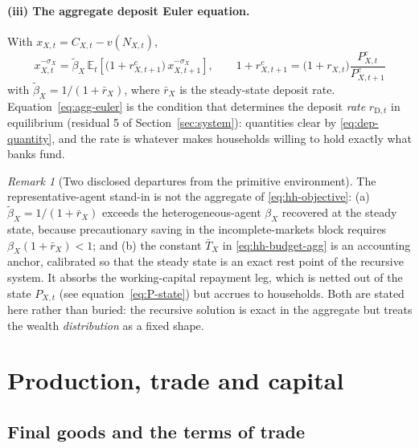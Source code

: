 \documentclass[11pt]{article}
\numberwithin{equation}{section}
\newcommand{\E}{\mathbb{E}}
\newcommand{\D}{\mathrm{D}}
\theoremstyle{definition}
\theoremstyle{plain}
\theoremstyle{remark}
\newtheorem{remark}{Remark}
\begin{document}
\paragraph{(iii) The aggregate deposit Euler equation.} With $x_{X,t}=C_{X,t}-v(N_{X,t})$,
\begin{equation}
\boxed{\;
x_{X,t}^{-\sigma_X}
=\tilde\beta_X\,
\E_t\!\left[\bigl(1+r^{c}_{X,t+1}\bigr)\,x_{X,t+1}^{-\sigma_X}\right],
\qquad
1+r^{c}_{X,t+1}=\bigl(1+r_{X,t}\bigr)\frac{P^{c}_{X,t}}{P^{c}_{X,t+1}} \;}
\label{eq:agg-euler}
\end{equation}
with $\tilde\beta_X=1/(1+\bar r_X)$, where $\bar r_X$ is the steady-state deposit
rate. Equation~\eqref{eq:agg-euler} is the condition that determines the deposit
\emph{rate} $r_{\D,t}$ in equilibrium (residual 5 of Section~\ref{sec:system}):
quantities clear by \eqref{eq:dep-quantity}, and the rate is whatever makes
households willing to hold exactly what banks fund.

\begin{remark}[Two disclosed departures from the primitive environment]
\label{rem:closure}
The representative-agent stand-in is not the aggregate of
\eqref{eq:hh-objective}: (a) $\tilde\beta_X=1/(1+\bar r_X)$ exceeds the
heterogeneous-agent $\beta_X$ recovered at the steady state, because precautionary
saving in the incomplete-markets block requires $\beta_X(1+\bar r_X)<1$; and (b) the
constant $\bar T_X$ in \eqref{eq:hh-budget-agg} is an accounting anchor, calibrated
so that the steady state is an exact rest point of the recursive system. It absorbs
the working-capital repayment leg, which is netted out of the state $P_{X,t}$ (see
equation~\eqref{eq:P-state}) but accrues to households. Both are stated here rather
than buried: the recursive solution is exact in the aggregate but treats the wealth
\emph{distribution} as a fixed shape.
\end{remark}

\section{Production, trade and capital}

\subsection{Final goods and the terms of trade}
\end{document}
